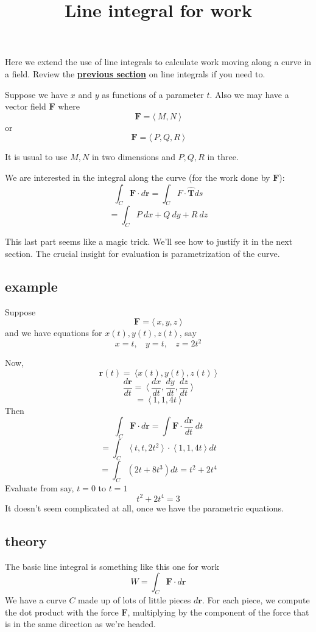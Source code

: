 \documentclass[11pt, oneside]{article}   	%
\title{Line integral for work}
\date{}
\begin{document}
\maketitle
\Large


Here we extend the use of line integrals to calculate work moving along a curve in a field.  Review the \hyperref[sec:line_integrals]{\textbf{previous section}} on line integrals if you need to.

Suppose we have $x$ and $y$ as functions of a parameter $t$.  Also we may have a vector field $\mathbf{F}$ where
\[ \mathbf{F} = \langle \ M,N \ \rangle \]
or
\[ \mathbf{F} = \langle \ P,Q,R \ \rangle \]

It is usual to use $M,N$ in two dimensions and $P,Q,R$ in three.

We are interested in the integral along the curve (for the work done by $\mathbf{F}$):
\[ \int_C \mathbf{F} \cdot d\mathbf{r} = \int_C F \cdot \hat{\mathbf{T}} ds \]
\[ = \int_C P \ dx + Q \ dy + R \ dz \]

This last part seems like a magic trick.  We'll see how to justify it in the next section.  The crucial insight for evaluation is parametrization of the curve.  

\subsection*{example}

Suppose
\[ \mathbf{F} = \langle \ x,y,z \ \rangle \]
and we have equations for $x(t), y(t), z(t)$, say
\[ x = t, \ \ \ \ y = t, \ \ \ \ z = 2t^2 \]

Now,
\[ \mathbf{r}(t) = \ \langle x(t), y(t), z(t) \ \rangle \]
\[\frac{d\mathbf{r}}{dt} = \ \langle \ \frac{dx}{dt},\frac{dy}{dt},\frac{dz}{dt} \ \rangle \]
\[ = \ \langle \ 1,1,4t \ \rangle \]
Then
\[ \int_C \mathbf{F} \cdot d \mathbf{r} = \int \mathbf{F} \cdot \frac{d\mathbf{r}}{dt} \ dt \]
\[ = \int_C \ \langle \ t,t,2t^2 \ \rangle \  \cdot \ \langle \ 1,1,4t \ \rangle \ dt \]
\[ = \int_C (2t + 8t^3) dt = t^2 + 2t^4 \]
Evaluate from say, $t=0$ to $t=1$
\[  t^2 + 2t^4 = 3 \]
It doesn't seem complicated at all, once we have the parametric equations.

\subsection*{theory}

The basic line integral is something like this one for work
\[ W = \int_C \mathbf{F} \cdot d\mathbf{r} \]
We have a curve $C$ made up of lots of little pieces $d\mathbf{r}$.  For each piece, we compute the dot product with the force $\mathbf{F}$, multiplying by the component of the force that is in the same direction as we're headed.  
\end{document}

